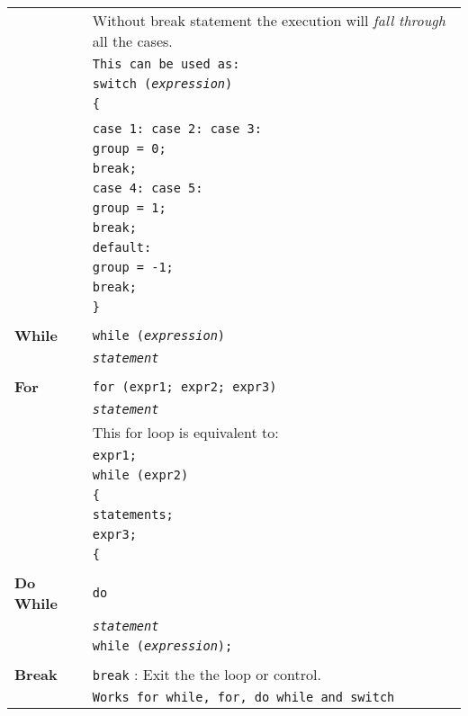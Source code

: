 \begin{multicols*}{3}
\begin{tabularx}{\linewidth}{l|X}
& Without break statement the execution will \textit{fall through} all the cases.\\
& \texttt{This can be used as:} \\
%
& \texttt{switch (\textit{expression})}\\
& \texttt{\{} \\
& \hspace{10pt} \\
& \texttt{\qquad case 1: case 2: case 3:}\\
& \texttt{\qquad \qquad group = 0;}\\
& \texttt{\qquad \qquad break;}\\
& \texttt{\qquad case 4: case 5:}\\
& \texttt{\qquad \qquad group = 1;}\\
& \texttt{\qquad \qquad break;}\\
& \texttt{\qquad default:} \\
& \texttt{\qquad \qquad group = -1;}\\
& \texttt{\qquad \qquad break;}\\
& \texttt{\}}\\
\hline\\
\textbf{While} & \texttt{while (\textit{expression})}\\
& \texttt{\qquad \textit{statement}}\\
\hline \\
\textbf{For} & \texttt{for (expr1; expr2; expr3)}\\
& \texttt{\qquad \textit{statement}} \\
& This for loop is equivalent to:\\
& \texttt{expr1;}\\
& \texttt{while (expr2)} \\
& \texttt{\{}\\
& \texttt{\qquad statements;}\\
& \texttt{\qquad expr3;}\\
& \texttt{\{}\\
\hline\\
\textbf{Do While} & \texttt{do}\\
& \texttt{\qquad \textit{statement}}\\
& \texttt{while (\textit{expression});}\\
\hline\\
\textbf{Break} & \texttt{break} : Exit the the loop or control.\\
& \texttt{Works for \texttt{while, for, do while} and \texttt{switch}}\\


\end{tabularx}
\end{multicols*}
